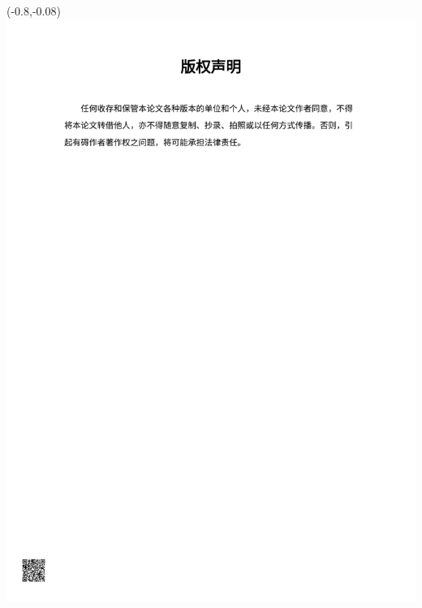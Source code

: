 \begin{textblock}{1}(-0.8,-0.08)
    \colorbox{white}{
        \includegraphics[height = 1.2448\textheight]{版权声明.pdf}
    }
\end{textblock}

